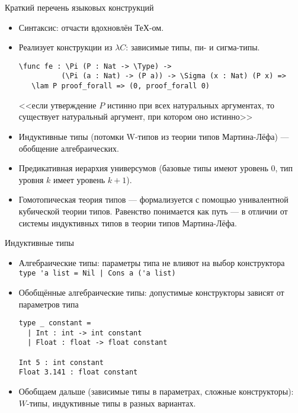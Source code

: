 \documentclass[aspectratio=169,dvipsnames,usenames]{beamer}
\begin{document}
\begin{frame}[fragile]{Краткий перечень языковых конструкций}
\begin{itemize}
\item Синтаксис: отчасти вдохновлён ТеХ-ом.
\item Реализует конструкции из $\lambda C$: зависимые типы, пи- и сигма-типы.
\small\color[HTML]{025002}
\begin{verbatim}
\func fe : \Pi (P : Nat -> \Type) -> 
          (\Pi (a : Nat) -> (P a)) -> \Sigma (x : Nat) (P x) =>
   \lam P proof_forall => (0, proof_forall 0)
\end{verbatim}
\normalsize\color{black}
<<если утверждение $P$ истинно при всех натуральных аргументах, то существует натуральный
аргумент, при котором оно истинно>>
\item Индуктивные типы (потомки W-типов из теории типов Мартина-Лёфа) --- обобщение алгебраических.
\item Предикативная иерархия универсумов (базовые типы имеют уровень 0, тип уровня $k$ имеет уровень $k+1$).
\item Гомотопическая теория типов --- формализуется с помощью унивалентной кубической теории типов.
Равенство понимается как путь --- в отличии от системы индуктивных типов в теории типов Мартина-Лёфа.
\end{itemize}
\end{frame}

\begin{frame}[fragile]{Индуктивные типы}
\begin{itemize}
\item Алгебраические типы: параметры типа не влияют на выбор конструктора
\small\color[HTML]{025002}
\verb!type 'a list = Nil | Cons a ('a list)!
\normalsize
\color{black}

\item Обобщённые алгебраические типы: допустимые конструкторы зависят от параметров типа
\small\color[HTML]{025002}\begin{verbatim}
type _ constant =
  | Int : int -> int constant
  | Float : float -> float constant

Int 5 : int constant
Float 3.141 : float constant
\end{verbatim}\normalsize 
\color{black}

\item Обобщаем дальше (зависимые типы в параметрах, сложные конструкторы): $W$-типы, индуктивные типы в разных вариантах.
\end{itemize}
\end{frame}
\end{document}
